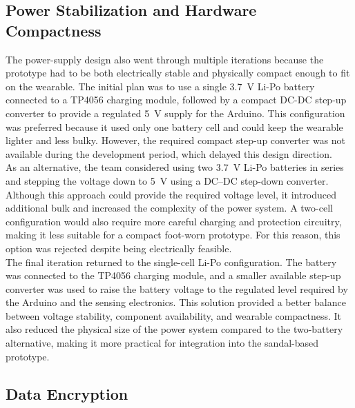 \subsection{Power Stabilization and Hardware Compactness}
\label{subsec:iteration_power_hardware}

\noindent The power-supply design also went through multiple iterations because the prototype had to be both electrically stable and physically compact enough to fit on the wearable. The initial plan was to use a single 3.7~V Li-Po battery connected to a TP4056 charging module, followed by a compact DC-DC step-up converter to provide a regulated 5~V supply for the Arduino. This configuration was preferred because it used only one battery cell and could keep the wearable lighter and less bulky. However, the required compact step-up converter was not available during the development period, which delayed this design direction. \\

\noindent As an alternative, the team considered using two 3.7~V Li-Po batteries in series and stepping the voltage down to 5~V using a DC--DC step-down converter. Although this approach could provide the required voltage level, it introduced additional bulk and increased the complexity of the power system. A two-cell configuration would also require more careful charging and protection circuitry, making it less suitable for a compact foot-worn prototype. For this reason, this option was rejected despite being electrically feasible. \\

\noindent The final iteration returned to the single-cell Li-Po configuration. The battery was connected to the TP4056 charging module, and a smaller available step-up converter was used to raise the battery voltage to the regulated level required by the Arduino and the sensing electronics. This solution provided a better balance between voltage stability, component availability, and wearable compactness. It also reduced the physical size of the power system compared to the two-battery alternative, making it more practical for integration into the sandal-based prototype. \\







\subsection{Data Encryption}
\label{subsec:iteration_enc}










